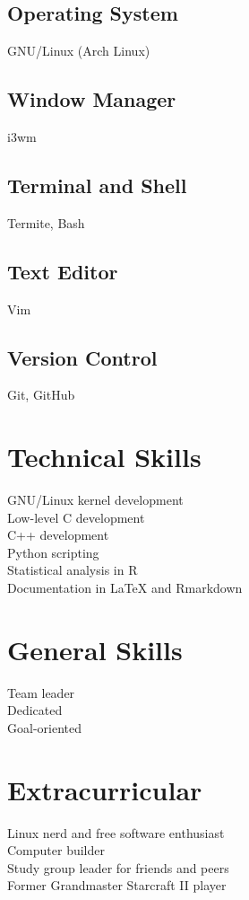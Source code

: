 \documentclass[]{article}
\theoremstyle{plain}
\theoremstyle{remark}
\theoremstyle{definition}
\begin{document}
\begin{figure}
\begin{minipage}[t]{0.32\textwidth}
\subsection{Operating System}
GNU/Linux (Arch Linux)

\subsection{Window Manager}
i3wm

\subsection{Terminal and Shell}
Termite, Bash

\subsection{Text Editor}
Vim

\subsection{Version Control}
Git, GitHub

\section{Technical Skills}
GNU/Linux kernel development\\
Low-level C development\\
C++ development\\
Python scripting\\
Statistical analysis in R\\
Documentation in \LaTeX{} and Rmarkdown

\section{General Skills}
Team leader\\
Dedicated\\
Goal-oriented

\section{Extracurricular}

Linux nerd and free software enthusiast\\
Computer builder\\
Study group leader for friends and peers\\
Former Grandmaster Starcraft II player

\end{minipage}
\end{figure}
\end{document}
